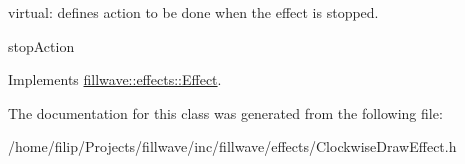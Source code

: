 virtual\+: defines action to be done when the effect is stopped. 

stop\+Action 

Implements \hyperlink{classfillwave_1_1effects_1_1Effect_aed8c053b5798cbbc6668117989d18ead}{fillwave\+::effects\+::\+Effect}.



The documentation for this class was generated from the following file\+:\begin{DoxyCompactItemize}
\item 
/home/filip/\+Projects/fillwave/inc/fillwave/effects/Clockwise\+Draw\+Effect.\+h\end{DoxyCompactItemize}
